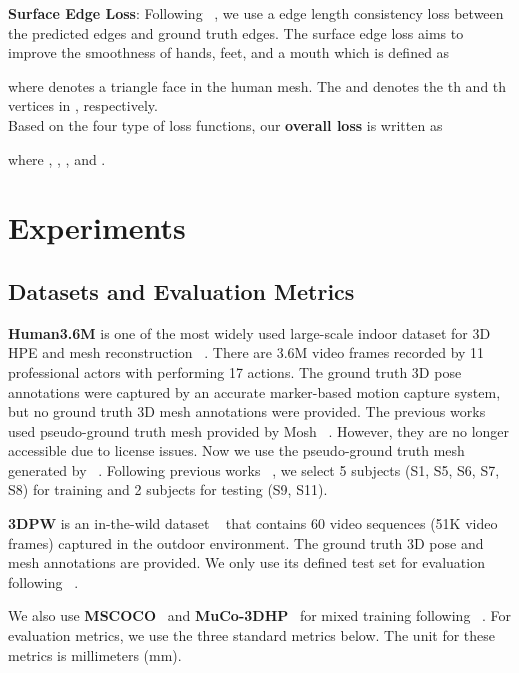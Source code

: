 \documentclass[sigconf]{acmart}
\begin{document}
\textbf{Surface Edge Loss}: Following ~\cite{wang2018pixel2mesh,Choi_2020_ECCV_Pose2Mesh}, we use a edge length consistency loss between the predicted edges and ground truth edges. The surface edge loss aims to improve the smoothness of hands, feet, and a mouth which is defined as

where  denotes a triangle face in the human mesh. The  and  denotes the th and th vertices in , respectively. \\

\noindent Based on the four type of loss functions, our \textbf{overall loss} is written as

where , , , and  .   

\section{Experiments}
\subsection{Datasets and Evaluation Metrics}
\textbf{Human3.6M} is one of the most widely used large-scale indoor dataset for 3D HPE and mesh reconstruction ~\cite{h36m_pami}. There are 3.6M video frames recorded by 11 professional actors with performing 17 actions. The ground truth 3D pose annotations were captured by an accurate marker-based motion capture system, but no ground truth 3D mesh annotations were provided. The previous works ~\cite{Kolotouros2019SPIN,kanazawaHMR18,kolotouros2019cmr} used pseudo-ground truth mesh provided by Mosh ~\cite{loper2014mosh}. However, they are no longer accessible due to license issues. Now we use the pseudo-ground truth mesh generated by ~\cite{Choi_2020_ECCV_Pose2Mesh}. Following previous works  ~\cite{Kolotouros2019SPIN,kanazawaHMR18,kolotouros2019cmr,Choi_2020_ECCV_Pose2Mesh}, we select 5 subjects (S1, S5, S6, S7, S8) for training and 2 subjects for testing (S9, S11). 

\textbf{3DPW }is an in-the-wild dataset ~\cite{pw3d2018} that contains 60 video sequences (51K video frames) captured in the outdoor environment. The ground truth 3D pose and mesh annotations are provided. We only use its defined test set for evaluation following ~\cite{Kolotouros2019SPIN,Choi_2020_ECCV_Pose2Mesh}.  

We also use \textbf{MSCOCO}~\cite{lin2014mscoco} and \textbf{MuCo-3DHP}~\cite{muco2018} for mixed training following ~\cite{Choi_2020_ECCV_Pose2Mesh,Kolotouros2019SPIN,Moon_I2L_MeshNet}.
For evaluation metrics, we use the three standard metrics below. The unit for these metrics is millimeters (mm). 
\end{document}
